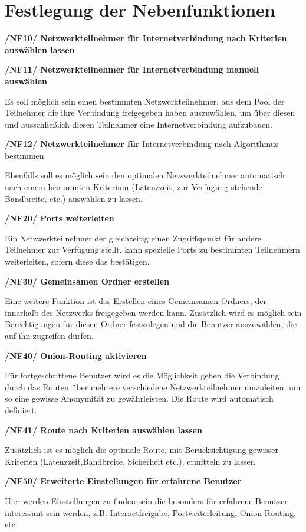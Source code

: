 \documentclass[a4paper,12pt]{scrreprt}
\begin{document}
	\section{Festlegung der Nebenfunktionen}
	\textbf {/NF10/ Netzwerkteilnehmer für Internetverbindung nach Kriterien auswählen lassen}
	
	
   	\textbf {/NF11/ Netzwerkteilnehmer für Internetverbindung manuell auswählen}
	
	Es soll möglich sein einen bestimmten Netzwerkteilnehmer, aus dem Pool der Teilnehmer die ihre Verbindung freigegeben haben auszuwählen, um über diesen und ausschließlich diesen Teilnehmer eine Internetverbindung aufzubauen.
	
	\textbf {/NF12/ Netzwerkteilnehmer für} Internetverbindung nach Algorithmus bestimmen
	
	Ebenfalls soll es möglich sein den optimalen Netzwerkteilnehmer automatisch nach einem bestimmten Kriterium (Latenzzeit, zur Verfügung stehende Bandbreite, etc.) auswählen zu lassen.
	
	\textbf {/NF20/ Ports weiterleiten}
	
	Ein Netzwerkteilnehmer der gleichzeitig einen Zugriffspunkt für andere Teilnehmer zur Verfügung stellt, kann spezielle Ports zu bestimmten Teilnehmern weiterleiten, sofern diese das bestätigen.
	
	\textbf {/NF30/ Gemeinsamen Ordner erstellen}
	
	Eine weitere Funktion ist das Erstellen eines Gemeinsamen Ordners, der innerhalb des Netzwerks freigegeben werden kann. Zusätzlich wird es möglich sein Berechtigungen für diesen Ordner festzulegen und die Benutzer auszuwählen, die auf ihn zugreifen dürfen.
	
	\textbf {/NF40/ Onion-Routing aktivieren}
	
	Für fortgeschrittene Benutzer wird es die Möglichkeit geben die Verbindung durch das Routen über mehrere verschiedene Netzwerkteilnehmer umzuleiten, um so eine gewisse Anonymität zu gewährleisten. Die Route wird automatisch definiert.
	
	\textbf {/NF41/ Route nach Kriterien auswählen lassen}
	
	Zusätzlich ist es möglich die optimale Route, mit Berücksichtigung gewisser Kriterien (Latenzzeit,Bandbreite, Sicherheit etc.), ermitteln zu lassen
	
	\textbf {/NF50/ Erweiterte Einstellungen für erfahrene Benutzer}
	
	Hier werden Einstellungen zu finden sein die besonders für erfahrene Benutzer interessant sein werden, z.B. Internetfreigabe, Portweiterleitung, Onion-Routing, etc.
	
\end{document}
